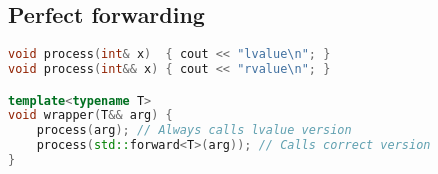
\subsection{Perfect forwarding}
\begin{lstlisting}[language=cpp]
void process(int& x)  { cout << "lvalue\n"; }
void process(int&& x) { cout << "rvalue\n"; }

template<typename T>
void wrapper(T&& arg) {
    process(arg); // Always calls lvalue version
    process(std::forward<T>(arg)); // Calls correct version
}
\end{lstlisting}
